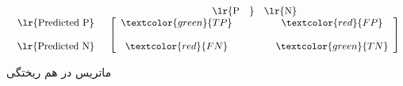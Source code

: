 
\begin{table}
    \centering
    \[
\begin{array}{c c} &

\begin{array}{c c} \text{\lr{P\quad}} & \text{\lr{N}} \\
\end{array}
\\
\begin{array}{c c}
\text{\lr{Predicted P}} \\\\
\text{\lr{Predicted N}}
\end{array}
&
\left[
\begin{array}{c c}
\textcolor{green}{TP}\hspace{1.2cm} & \textcolor{red}{FP}  \\\\
\textcolor{red}{FN}\hspace{1.2cm} & \textcolor{green}{TN}
\end{array}
\right]
\end{array}
\]
    \caption{ماتریس در هم ریختگی}
    \label{tab:conf_matrix_def}
\end{table}
